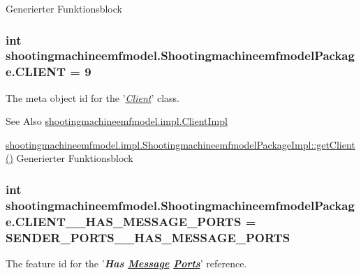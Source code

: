 Generierter Funktionsblock  \hypertarget{interfaceshootingmachineemfmodel_1_1_shootingmachineemfmodel_package_a1c00701cdfb4ee9e77a8d05edc4c89ed}{
\subsubsection[{C\-L\-I\-E\-N\-T}]{\setlength{\rightskip}{0pt plus 5cm}int shootingmachineemfmodel.\-Shootingmachineemfmodel\-Package.\-C\-L\-I\-E\-N\-T = 9}}\label{interfaceshootingmachineemfmodel_1_1_shootingmachineemfmodel_package_a1c00701cdfb4ee9e77a8d05edc4c89ed}
The meta object id for the '\hyperlink{classshootingmachineemfmodel_1_1impl_1_1_client_impl}{{\itshape Client}}' class.

\begin{DoxySeeAlso}{See Also}
\hyperlink{classshootingmachineemfmodel_1_1impl_1_1_client_impl}{shootingmachineemfmodel.\-impl.\-Client\-Impl} 

\hyperlink{classshootingmachineemfmodel_1_1impl_1_1_shootingmachineemfmodel_package_impl_a123185c43f45f06c9153fad113ff5642}{shootingmachineemfmodel.\-impl.\-Shootingmachineemfmodel\-Package\-Impl\-::get\-Client()} Generierter Funktionsblock 
\end{DoxySeeAlso}
\hypertarget{interfaceshootingmachineemfmodel_1_1_shootingmachineemfmodel_package_a202487038e6af15ca1b3bb8742010a8e}{
\subsubsection[{C\-L\-I\-E\-N\-T\-\_\-\-\_\-\-H\-A\-S\-\_\-\-M\-E\-S\-S\-A\-G\-E\-\_\-\-P\-O\-R\-T\-S}]{\setlength{\rightskip}{0pt plus 5cm}int shootingmachineemfmodel.\-Shootingmachineemfmodel\-Package.\-C\-L\-I\-E\-N\-T\-\_\-\-\_\-\-H\-A\-S\-\_\-\-M\-E\-S\-S\-A\-G\-E\-\_\-\-P\-O\-R\-T\-S = {\bf S\-E\-N\-D\-E\-R\-\_\-\-P\-O\-R\-T\-S\-\_\-\-\_\-\-H\-A\-S\-\_\-\-M\-E\-S\-S\-A\-G\-E\-\_\-\-P\-O\-R\-T\-S}}}\label{interfaceshootingmachineemfmodel_1_1_shootingmachineemfmodel_package_a202487038e6af15ca1b3bb8742010a8e}
The feature id for the '{\itshape {\bfseries Has \hyperlink{interfaceshootingmachineemfmodel_1_1_message}{Message} \hyperlink{interfaceshootingmachineemfmodel_1_1_ports}{Ports}}}' reference.

